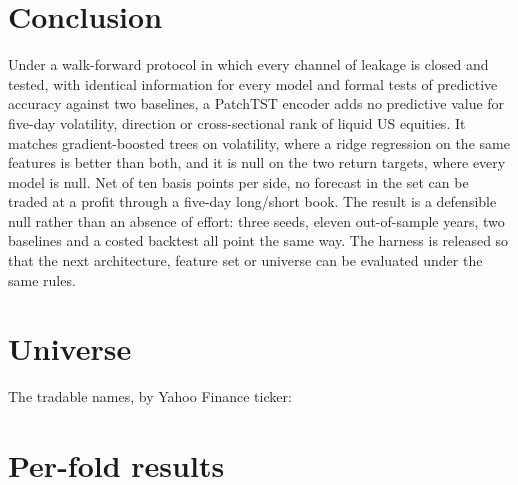 \documentclass[10pt,a4paper,twoside,twocolumn]{article}
\begin{document}
\section{Conclusion}\label{sec:conclusion}

Under a walk-forward protocol in which every channel of leakage is closed and tested, with identical information for every model and formal tests of predictive accuracy against two baselines, a PatchTST encoder adds no predictive value for five-day volatility, direction or cross-sectional rank of liquid US equities. It matches gradient-boosted trees on volatility, where a ridge regression on the same features is better than both, and it is null on the two return targets, where every model is null. Net of ten basis points per side, no forecast in the set can be traded at a profit through a five-day long/short book. The result is a defensible null rather than an absence of effort: three seeds, eleven out-of-sample years, two baselines and a costed backtest all point the same way. The harness is released so that the next architecture, feature set or universe can be evaluated under the same rules.




\appendix

\section{Universe}\label{app:universe}

The \metantickers{} tradable names, by Yahoo Finance ticker: 

\section{Per-fold results}\label{app:folds}

\begin{table}[t]
\centering\small
\caption{Volatility RMSE by test fold, seed-averaged; the last row pools all test samples.}

\end{table}

\begin{table}[t]
\centering\small
\caption{Direction accuracy by test fold, seed-averaged.}

\end{table}

\begin{table}[t]
\centering\small
\caption{Rank IC by test fold, seed-averaged.}

\end{table}
\end{document}
